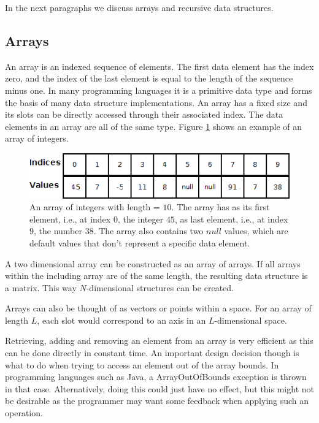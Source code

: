 In the next paragraphs we discuss arrays and recursive data structures.


\subsection{Arrays}

An array is an indexed sequence of elements. The first data element has the index zero, and the index of the last element is equal to the length of the sequence minus one. In many programming languages it is a primitive data type and forms the basis of many data structure implementations. An array has a fixed size and its slots can be directly accessed through their associated index. The data elements in an array are all of the same type. Figure \ref{fig:array} shows an example of an array of integers.

\begin{figure}[H]
	\begin{center}
		\includegraphics[width=0.6\columnwidth]{img/programming-fundamentals/array}
		\caption{An array of integers with length = $10$. The array has as its first element, i.e., at index $0$, the integer $45$, as last element, i.e., at index $9$, the number $38$. The array also contains two $null$ values, which are default values that don't represent a specific data element.}
		\label{fig:array}
	\end{center}
\end{figure}

A two dimensional array can be constructed as an array of arrays. If all arrays within the including array are of the same length, the resulting data structure is a matrix. This way $N$-dimensional structures can be created.

Arrays can also be thought of as vectors or points within a space. For an array of length $L$, each slot would correspond to an axis in an $L$-dimensional space.

Retrieving, adding and removing an element from an array is very efficient as this can be done directly in constant time. An important design decision though is what to do when trying to access an element out of the array bounds. In programming languages such as Java, a ArrayOutOfBounds exception is thrown in that case. Alternatively, doing this could just have no effect, but this might not be desirable as the programmer may want some feedback when applying such an operation.

